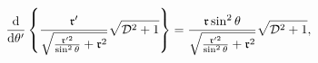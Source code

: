 \begin{equation}
\frac{\mathrm{d}}{\mathrm{d}\theta ^{\prime }}\left\{ \frac{\frak{r}^{\prime
}}{\sqrt{\frac{\frak{r}^{\prime 2}}{\sin ^{2}\theta }+\frak{r}^{2}}}\sqrt{%
\mathcal{D}^{2}+1}\right\} =\frac{\frak{r}\sin ^{2}\theta }{\sqrt{\frac{%
\frak{r}^{\prime 2}}{\sin ^{2}\theta }+\frak{r}^{2}}}\sqrt{\mathcal{D}^{2}+1}%
,  \label{eqdiff}
\end{equation}


